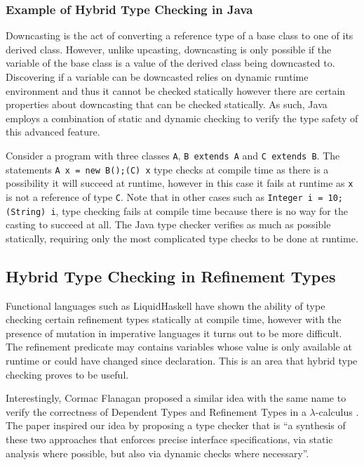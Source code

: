 \documentclass[a4paper,12pt]{report}
\begin{document}
\subsubsection{Example of Hybrid Type Checking in Java} 
Downcasting is the act of converting a reference type of a base class to one of its 
derived class. However, unlike upcasting, downcasting is only possible if the 
variable of the base class is a value of the derived class being downcasted to. 
Discovering if a variable can be downcasted relies on dynamic runtime 
environment and thus it cannot be checked statically however there are certain 
properties about downcasting that can be checked statically. As such, 
Java employs a combination of static and dynamic checking 
to verify the type safety of this advanced feature. 

\par
Consider a program with three classes \verb|A|, \verb|B extends A| and 
\verb|C extends B|. The statements \verb|A x = new B();(C) x| 
type checks at compile time as there is a possibility it will succeed at 
runtime, however in this case it fails at runtime as \verb|x| is not a reference of 
type \verb|C|. Note that in other cases such as \verb|Integer i = 10; (String) i|, 
type checking fails at compile time because there is no way for the casting to 
succeed at all. The Java type checker verifies as much as possible 
statically, requiring only the most complicated type checks to be done at runtime. 

\subsection{Hybrid Type Checking in Refinement Types} \label{section:htc_ref}
Functional languages such as LiquidHaskell have shown the ability of type 
checking certain refinement types statically at compile time, however with the 
presence of mutation in imperative languages it turns out to be more difficult. 
The refinement predicate may contains variables whose value is only available 
at runtime or could have changed since declaration. This is an area that hybrid 
type checking proves to be useful. 

\par
Interestingly, Cormac Flanagan 
proposed a similar idea with the same name to verify the correctness of 
Dependent Types and Refinement Types 
in a $\lambda$-calculus \cite{hybridTypeChecking}. The paper 
inspired our idea by proposing a type checker that is 
``a synthesis of these two approaches that enforces precise interface 
specifications, via static analysis where possible, but also via 
dynamic checks where necessary''.
\end{document}

